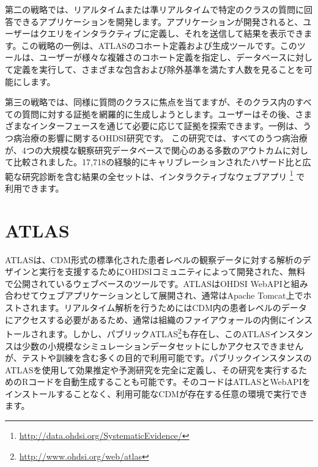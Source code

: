 \documentclass[
  11pt]{book}
\theoremstyle{definition}
\theoremstyle{definition}
\theoremstyle{definition}
\theoremstyle{definition}
\theoremstyle{remark}
\begin{document}
第二の戦略では、リアルタイムまたは準リアルタイムで特定のクラスの質問に回答できるアプリケーションを開発します。アプリケーションが開発されると、ユーザーはクエリをインタラクティブに定義し、それを送信して結果を表示できます。この戦略の一例は、ATLASのコホート定義および生成ツールです。このツールは、ユーザーが様々な複雑さのコホート定義を指定し、データベースに対して定義を実行して、さまざまな包含および除外基準を満たす人数を見ることを可能にします。

第三の戦略では、同様に質問のクラスに焦点を当てますが、そのクラス内のすべての質問に対する証拠を網羅的に生成しようとします。ユーザーはその後、さまざまなインターフェースを通じて必要に応じて証拠を探索できます。一例は、うつ病治療の影響に関するOHDSI研究です\citep{schuemie_2018b}。 この研究では、すべてのうつ病治療が、4つの大規模な観察研究データベースで関心のある多数のアウトカムに対して比較されました。17,718の経験的にキャリブレーションされたハザード比と広範な研究診断を含む結果の全セットは、インタラクティブなウェブアプリ \footnote{\url{http://data.ohdsi.org/SystematicEvidence/}} で利用できます。

\section{ATLAS}\label{atlas}

ATLASは、CDM形式の標準化された患者レベルの観察データに対する解析のデザインと実行を支援するためにOHDSIコミュニティによって開発された、無料で公開されているウェブベースのツールです。ATLASはOHDSI WebAPIと組み合わせてウェブアプリケーションとして展開され、通常はApache Tomcat上でホストされます。リアルタイム解析を行うためにはCDM内の患者レベルのデータにアクセスする必要があるため、通常は組織のファイアウォールの内側にインストールされます。しかし、パブリックATLAS\footnote{\url{http://www.ohdsi.org/web/atlas}}も存在し、このATLASインスタンスは少数の小規模なシミュレーションデータセットにしかアクセスできませんが、テストや訓練を含む多くの目的で利用可能です。パブリックインスタンスのATLASを使用して効果推定や予測研究を完全に定義し、その研究を実行するためのRコードを自動生成することも可能です。そのコードはATLASとWebAPIをインストールすることなく、利用可能なCDMが存在する任意の環境で実行できます。
\end{document}
